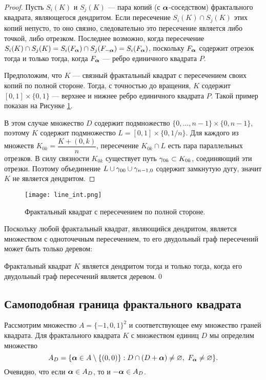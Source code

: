 \begin{proof}
Пусть $S_i(K)$ и $S_j(K)$ --- пара копий (с ${\bm{\alpha}}$-соседством) фрактального квадрата, являющегося дендритом.
Если пересечение $S_i(K)\cap S_j(K)$ этих копий непусто, то оно связно, следовательно это пересечение  является либо точкой, либо отрезком.
Последнее возможно, когда пересечение $S_i(K)\cap S_j(K)=S_i(F_{\bm{\alpha}})\cap S_j(F_{-{\bm{\alpha}}})=S_i(F_{\bm{\alpha}})$, поскольку $F_{\bm{\alpha}}$ содержит отрезок тогда и только тогда, когда $F_{\bm{\alpha}}$ --- ребро единичного квадрата $P$. 

Предположим, что $K$ --- связный фрактальный квадрат с пересечением своих копий по полной стороне. 
Тогда, с точностью до вращения, $K$ содержит $[0,1]\times\{0,1\}$  --- верхнее и нижнее ребро единичного квадрата $P$.
Такой пример показан на Рисунке \ref{fig:line_int}.

В этом случае множество $D$ содержит подмножество $ \{0,\ldots,n-1\}\times \{0,n-1\}$, поэтому $K$ содержит подмножество $L=[0,1]\times\{0,1/n\}$. 
Для каждого из множеств $K_{0k}=\dfrac{K+(0,k)}{n}$, пересечение $K_{0k}\cap L$ есть пара параллельных отрезков. 
В силу связности $K_{0k}$ существует путь $\gamma_{0k}\subset K_{0k}$, соединяющий эти  отрезки. 
Поэтому объединение $L\cup\gamma_{00}\cup\gamma_{n-1,0}$ содержит замкнутую дугу, значит $K$ не является дендритом. 
\end{proof}

\begin{figure}[H]
 \centering
 \texttt{[image: line\_int.png]}
 \caption{Фрактальный квадрат с пересечением по полной стороне.}
 \label{fig:line_int}
\end{figure}

Поскольку любой фрактальный квадрат, являющийся дендритом, является множеством с одноточечным пересечением, то его двудольный граф пересечений может быть только деревом:

\begin{corollary}\label{cor:fsden}
Фрактальный квадрат $K$ является дендритом тогда и только тогда, когда его двудольный граф пересечений является деревом.\hfill\qed
\end{corollary}


\subsection{Самоподобная граница фрактального квадрата}

Рассмотрим множество $A=\{-1,0,1\}^2$ и соответствующее ему множество граней квадрата. 
Для фрактального квадрата $K$ с множеством единиц $D$ мы определим множество 
$$A_D=\{{\bm{\alpha}}\in A\setminus\{(0,0)\}: D\cap(D+{\bm{\alpha}})\neq\varnothing,\ F_{\bm{\alpha}}\neq\varnothing\}.$$ 
Очевидно, что если ${\bm{\alpha}}\in A_D$, то и $-{\bm{\alpha}}\in A_D$.

